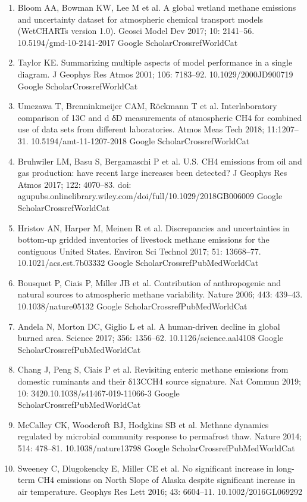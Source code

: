 \documentclass[a4paper,12pt]{article}
\begin{document}
{\begin{thebibliography}{}
\begin{enumerate}
    Google ScholarCrossrefWorldCat 
    \item	Bloom AA, Bowman KW, Lee M et al.  A global wetland methane emissions and uncertainty dataset for atmospheric chemical transport models (WetCHARTs version 1.0). Geosci Model Dev 2017; 10: 2141–56. 10.5194/gmd-10-2141-2017
    Google ScholarCrossrefWorldCat 
    \item	Taylor KE. Summarizing multiple aspects of model performance in a single diagram. J Geophys Res Atmos 2001; 106: 7183–92. 10.1029/2000JD900719
    Google ScholarCrossrefWorldCat 
    \item	Umezawa T, Brenninkmeijer CAM, Röckmann T et al.  Interlaboratory comparison of 13C and d δD measurements of atmospheric CH4 for combined use of data sets from different laboratories. Atmos Meas Tech 2018; 11:1207–31. 10.5194/amt-11-1207-2018
    Google ScholarCrossrefWorldCat 
    \item	Bruhwiler LM, Basu S, Bergamaschi P et al.  U.S. CH4 emissions from oil and gas production: have recent large increases been detected? J Geophys Res Atmos 2017; 122: 4070–83. doi: agupubs.onlinelibrary.wiley.com/doi/full/10.1029/2018GB006009
    Google ScholarCrossrefWorldCat 
    \item	Hristov AN, Harper M, Meinen R et al.  Discrepancies and uncertainties in bottom-up gridded inventories of livestock methane emissions for the contiguous United States. Environ Sci Technol 2017; 51: 13668–77. 10.1021/acs.est.7b03332
    Google ScholarCrossrefPubMedWorldCat 
    \item	Bousquet P, Ciais P, Miller JB et al.  Contribution of anthropogenic and natural sources to atmospheric methane variability. Nature 2006; 443: 439–43. 10.1038/nature05132
    Google ScholarCrossrefPubMedWorldCat 
    \item	Andela N, Morton DC, Giglio L et al.  A human-driven decline in global burned area. Science 2017; 356: 1356–62. 10.1126/science.aal4108
    Google ScholarCrossrefPubMedWorldCat 
    \item	Chang J, Peng S, Ciais P et al.  Revisiting enteric methane emissions from domestic ruminants and their δ13CCH4 source signature. Nat Commun 2019; 10: 3420.10.1038/s41467-019-11066-3
    Google ScholarCrossrefPubMedWorldCat 
    \item	McCalley CK, Woodcroft BJ, Hodgkins SB et al.  Methane dynamics regulated by microbial community response to permafrost thaw. Nature 2014; 514: 478–81. 10.1038/nature13798
    Google ScholarCrossrefPubMedWorldCat 
    \item	Sweeney C, Dlugokencky E, Miller CE et al.  No significant increase in long-term CH4 emissions on North Slope of Alaska despite significant increase in air temperature. Geophys Res Lett 2016; 43: 6604–11. 10.1002/2016GL069292

\end{enumerate}
\end{thebibliography}}
\end{document}
